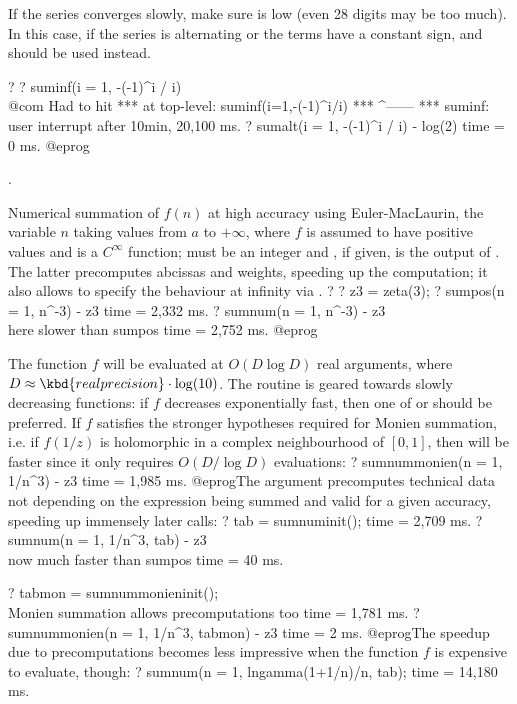 If the series converges slowly, make sure  is low (even 28
digits may be too much). In this case, if the series is alternating or the
terms have a constant sign,  and  should be used
instead.

\bprog
? 
? suminf(i = 1, -(-1)^i / i)   \\@com Had to hit 
  ***   at top-level: suminf(i=1,-(-1)^i/i)
  ***                                ^------
  *** suminf: user interrupt after 10min, 20,100 ms.
? sumalt(i = 1, -(-1)^i / i) - log(2)
time = 0 ms.
@eprog

.

\label{se:sumnum}
Numerical summation of $f(n)$ at high accuracy using Euler-MacLaurin,
the variable $n$ taking values from $a$ to $+\infty$, where $f$ is assumed to
have positive values and is a $C^\infty$ function;  must be an integer
and , if given, is the output of . The latter
precomputes abcissas and weights, speeding up the computation; it also allows
to specify the behaviour at infinity via .
\bprog
? 
? z3 = zeta(3);
? sumpos(n = 1, n^-3) - z3
time = 2,332 ms.
? sumnum(n = 1, n^-3) - z3 \\ here slower than sumpos
time = 2,752 ms.
@eprog

The function $f$ will be evaluated at $O(D \log D)$ real arguments,
where $D \approx \kbd{realprecision} \cdot \log(10)$. The routine is geared
towards slowly decreasing functions: if $f$ decreases exponentially fast,
then one of  or  should be preferred.
If $f$ satisfies the stronger hypotheses required for Monien summation,
i.e. if $f(1/z)$ is holomorphic in a complex neighbourhood of $[0,1]$,
then  will be faster since it only requires $O(D/\log D)$
evaluations:
\bprog
? sumnummonien(n = 1, 1/n^3) - z3
time = 1,985 ms.
@eprog\noindent The  argument precomputes technical data
not depending on the expression being summed and valid for a given accuracy,
speeding up immensely later calls:
\bprog
? tab = sumnuminit();
time = 2,709 ms.
? sumnum(n = 1, 1/n^3, tab) - z3 \\ now much faster than sumpos
time = 40 ms.

? tabmon = sumnummonieninit(); \\ Monien summation allows precomputations too
time = 1,781 ms.
? sumnummonien(n = 1, 1/n^3, tabmon) - z3
time = 2 ms.
@eprog\noindent The speedup due to precomputations becomes less impressive
when the function $f$ is expensive to evaluate, though:
\bprog
? sumnum(n = 1, lngamma(1+1/n)/n, tab);
time = 14,180 ms.

